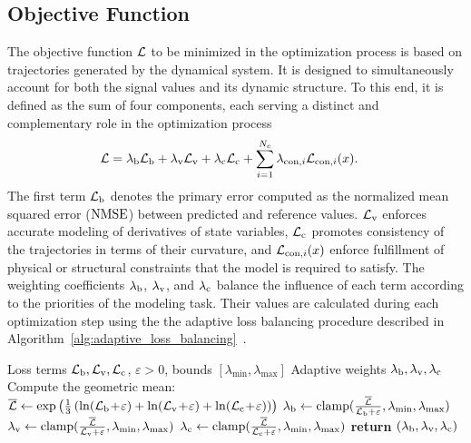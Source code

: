 \documentclass{ieeeaccess}
\begin{document}
\subsection{Objective Function}
The objective function \(\mathcal{L}\) to be minimized in the optimization process is based on trajectories generated by the dynamical system. It is designed to simultaneously account for both the signal values and its dynamic structure. To this end, it is defined as the sum of four components, each serving a distinct and complementary role in the optimization process
\begin{align}
  \mathcal{L} & = \lambda_{\text{b}} \mathcal{L}_{\text{b}} + \lambda_{\text{v}} \mathcal{L}_{\text{v}} + \lambda_{\text{c}} \mathcal{L}_{\text{c}} + \sum^{N_c}_{i=1} \lambda_{\text{con},i} \mathcal{L}_{\text{con},i}(x).\label{eq:loss_function}
\end{align}
The first term \(\mathcal{L}_{\text{b}}\) denotes the primary error computed as the normalized mean squared error (\(\operatorname{NMSE}\)) between predicted and reference values. \(\mathcal{L}_{\text{v}}\) enforces accurate modeling of derivatives of state variables, \(\mathcal{L}_{\text{c}}\) promotes consistency of the trajectories in terms of their curvature, and \(\mathcal{L}_{\text{con},i}(x)\) enforce fulfillment of physical or structural constraints that the model is required to satisfy. 
The weighting coefficients \(\lambda_{\text{b}}\), \(\lambda_{\text{v}}\), and \(\lambda_{\text{c}}\) balance the influence of each term according to the priorities of the modeling task.
Their values are calculated during each optimization step using the the adaptive loss balancing procedure described in Algorithm~\ref{alg:adaptive_loss_balancing}~\cite{Cipolla2018, Chen2018}.


\begin{algorithm}[H]
  \caption{Adaptive Loss Balancing with Clamping}
  \label{alg:adaptive_loss_balancing}
  \begin{algorithmic}[1]
    \REQUIRE Loss terms \(\mathcal{L}_{\text{b}}, \mathcal{L}_{\text{v}}, \mathcal{L}_{\text{c}}\), \(\varepsilon > 0\), bounds \([\lambda_{\min}, \lambda_{\max}]\)
    \ENSURE Adaptive weights \(\lambda_{\text{b}}, \lambda_{\text{v}}, \lambda_{\text{c}}\)
    \STATE Compute the geometric mean: \\
    \(\overline{\mathcal{L}} \gets \exp\left(\frac{1}{3} \left(\ln(\mathcal{L}_{\text{b}}\!+\!\varepsilon)+\ln(\mathcal{L}_{\text{v}}\!+\!\varepsilon)+\ln(\mathcal{L}_{\text{c}}\!+\!\varepsilon)\right)\right)\)
    \STATE \(\lambda_{\text{b}} \gets \text{clamp}(\frac{\overline{\mathcal{L}}}{\mathcal{L}_{\text{b}} + \varepsilon}, \lambda_{\min}, \lambda_{\max})\)
    \STATE \(\lambda_{\text{v}} \gets \text{clamp}(\frac{\overline{\mathcal{L}}}{\mathcal{L}_{\text{v}} + \varepsilon}, \lambda_{\min}, \lambda_{\max})\)
    \STATE \(\lambda_{\text{c}} \gets \text{clamp}(\frac{\overline{\mathcal{L}}}{\mathcal{L}_{\text{c}} + \varepsilon}, \lambda_{\min}, \lambda_{\max})\)
    \STATE \textbf{return} \((\lambda_{\text{b}}, \lambda_{\text{v}}, \lambda_{\text{c}})\)
  \end{algorithmic}
\end{algorithm}
\end{document}
